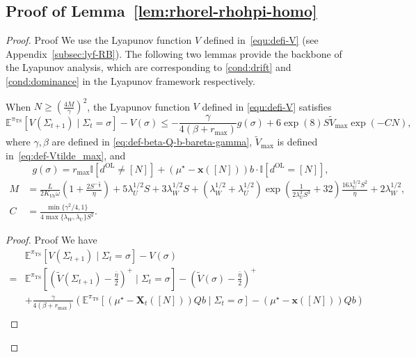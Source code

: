 \documentclass[mnsc,nonblindrev]{informs3}
\newcommand{\E}{\mathbb{E}}
\newcommand{\lwhalf}{\lambda_{W}^{1/2}}
\newcommand{\luhalf}{\lambda_{U}^{1/2}}
\newcommand{\pits}{\pi_{\mathrm{TS}}}
\newcommand{\bmx}{\bm{x}}
\begin{document}
\begin{APPENDICES}
\subsection{Proof of Lemma~\ref{lem:rhorel-rhohpi-homo}}\label{subsec:pr-C1-homo}

\begin{proof}{Proof}
We use the Lyapunov function $V$ defined in~\eqref{equ:defi-V} (see Appendix~\ref{subsec:lyf-RB}).
The following two lemmas provide the backbone of the Lyapunov analysis, which are corresponding to \ref{cond:drift} and \ref{cond:dominance} in the Lyapunov framework respectively. 
\begin{lemma}\label{lem:DC-RB}
    When $N\ge\left(\frac{4M}{\gamma}\right)^2$, the Lyapunov function $V$ defined in \eqref{equ:defi-V} satisfies 
    \[
        \E^{\pits}[V(\Sigma_{t+1})\mid \Sigma_t=\sigma]-V(\sigma)\le -\frac{\gamma}{4(\beta+r_{\max})}g(\sigma)+6\exp(8)S\tilde{V}_{\max}\exp\left(-CN\right),
    \]
    where $\gamma,\beta$ are defined in \eqref{eq:def-beta-Q-b-bareta-gamma}, $\tilde{V}_{\max}$ is defined in~\eqref{eq:def-Vtilde_max},  and
    \begin{equation}\label{def:g-sigma}
        g(\sigma)=r_{\max}\mathbb{I}[d^{\mathrm{OL}}\neq [N]]
+ (\mu^\star-\bmx([N]))b\cdot\mathbb{I}[d^{\mathrm{OL}}= [N]],
    \end{equation}
    \begin{equation}\label{def:g-C-M}
        \begin{aligned}
    M&=\frac{L}{2K_{Vh}\omega}\left(1+ \frac{2S^{-\frac{1}{2}}}
         {\eta}\right)+5\luhalf S+3\lwhalf S 
         +(\lwhalf+\luhalf)\exp\left(\frac{1}{2\lambda_U^3S^3}+32\right)\frac{16\lambda_U^{3/2}S^{2}}{\eta} +2\lwhalf,\\
         C&=\frac{\min\{\gamma^2/4,1\}}{4\max\{\lambda_W,\lambda_U\}S^2}.
        \end{aligned}
    \end{equation}
\end{lemma}
\begin{proof}{Proof}
We have
    \begin{align*}
        & \E^{\pits}[V(\Sigma_{t+1})\mid \Sigma_t=\sigma]-V(\sigma)\\
        = & \E^{\pits}\left[\left(\tilde V(\Sigma_{t+1})-\frac{\bar\eta}{2}\right)^+\mid \Sigma_t 
        = \sigma\right]-\left(\tilde V(\sigma)-\frac{\bar\eta}{2}\right)^+ \\
        &+\frac{\gamma}{4(\beta+r_{\max})}\left(\E^{\pits}\left[(\mu^\star-\bm{X}_t([N]))Qb\mid \Sigma_t=\sigma\right]-(\mu^\star-\bmx([N]))Qb\right) \\

\end{align*}
\end{proof}
\end{proof}
\end{APPENDICES}
\end{document}
